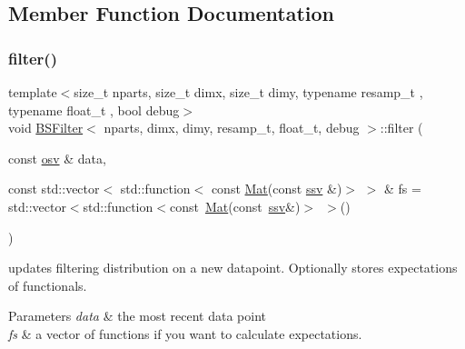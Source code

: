\subsection{Member Function Documentation}
\mbox{\label{classBSFilter_a76a59b050d0cc0397b1f594a0a1c22ac}} 
\subsubsection{\texorpdfstring{filter()}{filter()}}
{\footnotesize\ttfamily template$<$size\+\_\+t nparts, size\+\_\+t dimx, size\+\_\+t dimy, typename resamp\+\_\+t , typename float\+\_\+t , bool debug$>$ \\
void \hyperlink{classBSFilter}{B\+S\+Filter}$<$ nparts, dimx, dimy, resamp\+\_\+t, float\+\_\+t, debug $>$\+::filter (\begin{DoxyParamCaption}\item[{const \hyperlink{classBSFilter_a9a4da560f11a6e2d35ffe693de54826b}{osv} \&}]{data,  }\item[{const std\+::vector$<$ std\+::function$<$ const \hyperlink{classBSFilter_a190a71c131060b131c11ebe2c3fefbeb}{Mat}(const \hyperlink{classBSFilter_ad2341b982bcdabc798d7ed0f327d28f7}{ssv} \&)$>$ $>$ \&}]{fs = {\ttfamily std\+:\+:vector$<$std\+:\+:function$<$const~\hyperlink{classBSFilter_a190a71c131060b131c11ebe2c3fefbeb}{Mat}(const~\hyperlink{classBSFilter_ad2341b982bcdabc798d7ed0f327d28f7}{ssv}\&)$>$~$>$()} }\end{DoxyParamCaption})}



updates filtering distribution on a new datapoint. Optionally stores expectations of functionals. 


\begin{DoxyParams}{Parameters}
{\em data} & the most recent data point \\
\hline
{\em fs} & a vector of functions if you want to calculate expectations. \\
\hline
\end{DoxyParams}
\mbox{\label{classBSFilter_ac97a15ea8002b48e56d94c8de699caa2}} 
